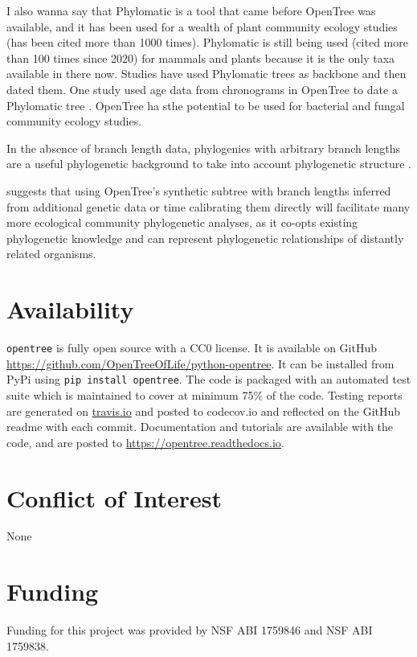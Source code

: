 \documentclass[oupdraft]{sysbio_sse}
\begin{document}
I also wanna say that Phylomatic \citep{webb2005phylomatic} is a tool that came before
OpenTree was available, and it has been used for a wealth of plant community ecology
studies (has been cited more than 1000 times).
Phylomatic is still being used (cited more than 100 times since 2020) for mammals
and plants because it is the only taxa available in there now.
Studies have used Phylomatic trees as backbone and then dated them. One study used
age data from chronograms in OpenTree to date a Phylomatic tree \citep{}.
OpenTree ha sthe potential to be used for bacterial and fungal community ecology studies.

In the absence of branch length data, phylogenies with arbitrary branch lengths
are a useful phylogenetic background to take into account phylogenetic structure
\citep{garland1992procedures}.

\citep{jantzen2019effects} suggests that using OpenTree's synthetic subtree with
branch lengths inferred from additional genetic data or time calibrating them directly
will facilitate many more ecological community phylogenetic analyses, as it co-opts existing
phylogenetic knowledge and can represent phylogenetic relationships of distantly related organisms.



\section{Availability}
\label{sec6}

\texttt{opentree} is fully open source with a CC0 license. It is available on GitHub \url{ https://github.com/OpenTreeOfLife/python-opentree}. It can be installed from PyPi using \texttt{pip install opentree}. The code is packaged with an automated test suite which is maintained to cover at minimum 75\% of the code. Testing reports are generated on \url{travis.io} and posted to {codecov.io} and reflected on the GitHub readme with each commit. Documentation and tutorials are available with the code, and are posted to \url{https://opentree.readthedocs.io}.


\section{Conflict of Interest}
None

\section{Funding}
Funding for this project was provided by NSF ABI 1759846 and NSF ABI 1759838.
\end{document}
